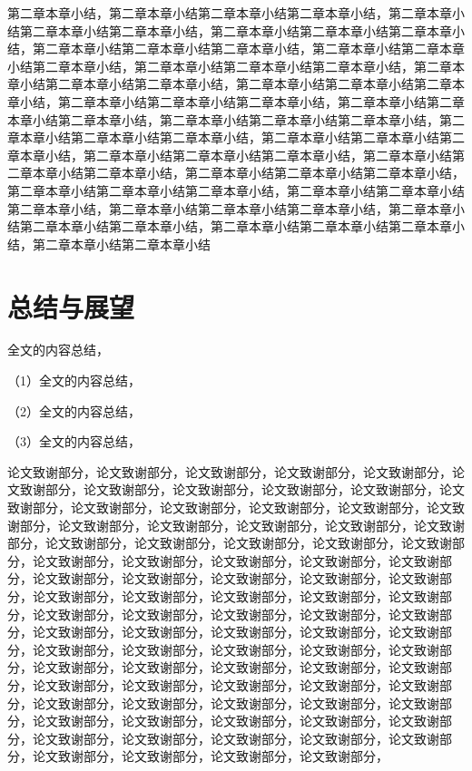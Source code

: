 \documentclass[unicode,pdfcover]{hquthesis}
\begin{document}
第二章本章小结，第二章本章小结第二章本章小结第二章本章小结，第二章本章小结第二章本章小结第二章本章小结，第二章本章小结第二章本章小结第二章本章小结，第二章本章小结第二章本章小结第二章本章小结，第二章本章小结第二章本章小结第二章本章小结，第二章本章小结第二章本章小结第二章本章小结，第二章本章小结第二章本章小结第二章本章小结，第二章本章小结第二章本章小结第二章本章小结，第二章本章小结第二章本章小结第二章本章小结，第二章本章小结第二章本章小结第二章本章小结，第二章本章小结第二章本章小结第二章本章小结，第二章本章小结第二章本章小结第二章本章小结，第二章本章小结第二章本章小结第二章本章小结，第二章本章小结第二章本章小结第二章本章小结，第二章本章小结第二章本章小结第二章本章小结，第二章本章小结第二章本章小结第二章本章小结，第二章本章小结第二章本章小结第二章本章小结，第二章本章小结第二章本章小结第二章本章小结，第二章本章小结第二章本章小结第二章本章小结，第二章本章小结第二章本章小结第二章本章小结，第二章本章小结第二章本章小结第二章本章小结，第二章本章小结第二章本章小结



\chapter{总结与展望}


全文的内容总结，

（1）全文的内容总结，

（2）全文的内容总结，

（3）全文的内容总结，


\backmatter





论文致谢部分，论文致谢部分，论文致谢部分，论文致谢部分，论文致谢部分，论文致谢部分，论文致谢部分，论文致谢部分，论文致谢部分，论文致谢部分，论文致谢部分，论文致谢部分，论文致谢部分，论文致谢部分，论文致谢部分，论文致谢部分，论文致谢部分，论文致谢部分，论文致谢部分，论文致谢部分，论文致谢部分，论文致谢部分，论文致谢部分，论文致谢部分，论文致谢部分，论文致谢部分，论文致谢部分，论文致谢部分，论文致谢部分，论文致谢部分，论文致谢部分，论文致谢部分，论文致谢部分，论文致谢部分，论文致谢部分，论文致谢部分，论文致谢部分，论文致谢部分，论文致谢部分，论文致谢部分，论文致谢部分，论文致谢部分，论文致谢部分，论文致谢部分，论文致谢部分，论文致谢部分，论文致谢部分，论文致谢部分，论文致谢部分，论文致谢部分，论文致谢部分，论文致谢部分，论文致谢部分，论文致谢部分，论文致谢部分，论文致谢部分，论文致谢部分，论文致谢部分，论文致谢部分，论文致谢部分，论文致谢部分，论文致谢部分，论文致谢部分，论文致谢部分，论文致谢部分，论文致谢部分，论文致谢部分，论文致谢部分，论文致谢部分，论文致谢部分，论文致谢部分，论文致谢部分，论文致谢部分，论文致谢部分，论文致谢部分，论文致谢部分，论文致谢部分，论文致谢部分，论文致谢部分，论文致谢部分，论文致谢部分，论文致谢部分，论文致谢部分，论文致谢部分，论文致谢部分，
\end{document}
